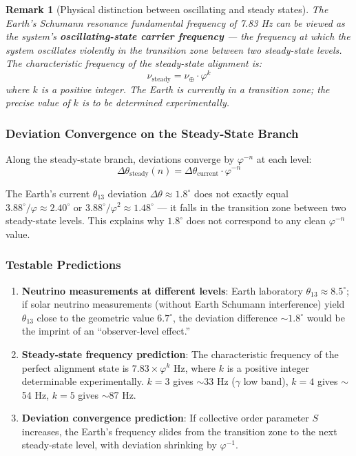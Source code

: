 \documentclass[12pt,a4paper,twocolumn]{article}
\renewcommand{\phi}{\varphi}
\newtheorem{remark}[theorem]{Remark}
\begin{document}
\begin{remark}[Physical distinction between oscillating and steady states]
The Earth's Schumann resonance fundamental frequency of 7.83 Hz can be viewed as the system's \textbf{oscillating-state carrier frequency} --- the frequency at which the system oscillates violently in the transition zone between two steady-state levels. The characteristic frequency of the steady-state alignment is:
\begin{equation}
\nu_{\text{steady}} = \nu_{\oplus} \cdot \phi^k
\label{eq:steady_freq_en}
\end{equation}
where $k$ is a positive integer. The Earth is currently in a transition zone; the precise value of $k$ is to be determined experimentally.
\end{remark}

\subsubsection{Deviation Convergence on the Steady-State Branch}

Along the steady-state branch, deviations converge by $\phi^{-n}$ at each level:
\begin{equation}
\Delta\theta_{\text{steady}}(n) = \Delta\theta_{\text{current}} \cdot \phi^{-n}
\label{eq:deviation_convergence_en}
\end{equation}

The Earth's current $\theta_{13}$ deviation $\Delta\theta \approx 1.8^\circ$ does not exactly equal $3.88^\circ/\phi \approx 2.40^\circ$ or $3.88^\circ/\phi^2 \approx 1.48^\circ$ --- it falls in the transition zone between two steady-state levels. This explains why $1.8^\circ$ does not correspond to any clean $\phi^{-n}$ value.

\subsubsection{Testable Predictions}

\begin{enumerate}
\item \textbf{Neutrino measurements at different levels}: Earth laboratory $\theta_{13}\approx 8.5^\circ$; if solar neutrino measurements (without Earth Schumann interference) yield $\theta_{13}$ close to the geometric value $6.7^\circ$, the deviation difference $\sim 1.8^\circ$ would be the imprint of an ``observer-level effect.''
\item \textbf{Steady-state frequency prediction}: The characteristic frequency of the perfect alignment state is $7.83\times\phi^k$ Hz, where $k$ is a positive integer determinable experimentally. $k=3$ gives $\sim$33 Hz ($\gamma$ low band), $k=4$ gives $\sim$54 Hz, $k=5$ gives $\sim$87 Hz.
\item \textbf{Deviation convergence prediction}: If collective order parameter $S$ increases, the Earth's frequency slides from the transition zone to the next steady-state level, with deviation shrinking by $\phi^{-1}$.
\end{enumerate}
\end{document}
